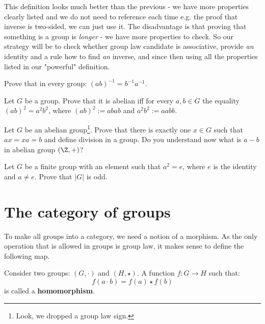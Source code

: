 This definition looks much better than the previous - we have more properties clearly listed and we do not need to reference each time e.g. the proof that inverse is two-sided, we can just use it. The disadvantage
is that proving that something is a group is \emph{longer} - we have more properties to check. So our strategy will be to check whether group law candidate is associative, provide \emph{an} identity and a rule how to find \emph{an} inverse, and since then using all the properties listed in our "powerful" definition.

\begin{exercise}
  Prove that in every group: $(ab)^{-1}=b^{-1}a^{-1}.$
\end{exercise}

\begin{exercise}
  Let $G$ be a group. Prove that it is abelian iff for every $a,b\in G$ the equality $(ab)^2=a^2b^2$, where $(ab)^2 := abab$ and $a^2b^2 := aabb$.
\end{exercise}

\begin{exercise}
  Let $G$ be an abelian group\footnote{Look, we dropped a group law sign.}. Prove that there is exactly one $x\in G$ such that $ax=xa=b$ and define division in a group. Do you understand now what is $a-b$ in abelian group $(\Z, +)$?
\end{exercise}

\begin{exercise}
  Let $G$ be a finite group with an element such that $a^2=e$, where $e$ is the identity and $a\neq e$. Prove that $|G|$ is odd.
\end{exercise}


\section{The category of groups}
To make all groups into a category, we need a notion of a morphism. As the only operation that is allowed in groups is group law, it makes sense to define the following map.

\begin{definition}
  Consider two groups: $(G,\cdot)$ and $(H, \star)$. A function $f: G\to H$ such that:
  $$f(a\cdot b)=f(a)\star f(b)$$
  is called a \textbf{homomorphism}.
\end{definition}

